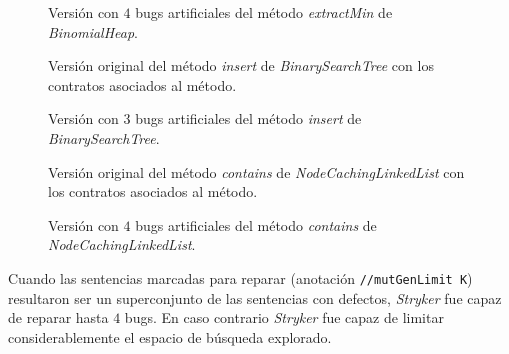\begin{figure}[H]
	
	\caption{Versi\'on con $4$ bugs artificiales del m\'etodo \emph{extractMin} de \emph{BinomialHeap}.}
	\label{figures.code.repair.binheap_extractMin_4bugs}
\end{figure}

\begin{figure}[H]
	
	\caption{Versi\'on original del m\'etodo \emph{insert} de \emph{BinarySearchTree} con los contratos asociados al m\'etodo.}
	\label{figures.code.repair.bintree_insert_orig}
\end{figure}

\begin{figure}[H]
	
	\caption{Versi\'on con $3$ bugs artificiales del m\'etodo \emph{insert} de \emph{BinarySearchTree}.}
	\label{figures.code.repair.bintree_insert_3bugs}
\end{figure}

\begin{figure}[H]
	
	\caption{Versi\'on original del m\'etodo \emph{contains} de \emph{NodeCachingLinkedList} con los contratos asociados al m\'etodo.}
	\label{figures.code.repair.ncll_contains_orig}
\end{figure}

\begin{figure}[H]
	
	\caption{Versi\'on con $4$ bugs artificiales del m\'etodo \emph{contains} de \emph{NodeCachingLinkedList}.}
	\label{figures.code.repair.ncll_contains_4bugs}
\end{figure}

Cuando las sentencias marcadas para reparar (anotaci\'on \texttt{//mutGenLimit K}) resultaron ser un superconjunto de las sentencias con defectos, \emph{Stryker} fue capaz de reparar hasta $4$ bugs. En caso contrario \emph{Stryker} fue capaz de limitar considerablemente el espacio de b\'usqueda explorado.